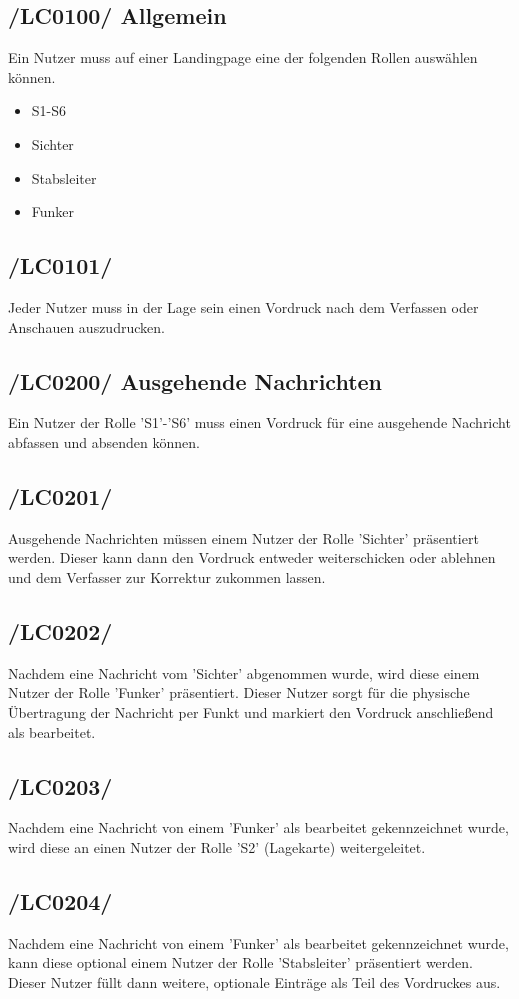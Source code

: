 \subsection{/LC0100/ Allgemein}
Ein Nutzer muss auf einer Landingpage eine der folgenden Rollen auswählen können.
\begin{itemize}
\item S1-S6
\item Sichter
\item Stabsleiter
\item Funker
\end{itemize}

\subsection{/LC0101/}
Jeder Nutzer muss in der Lage sein einen Vordruck nach dem Verfassen oder Anschauen auszudrucken.

\subsection{/LC0200/ Ausgehende Nachrichten} 
Ein Nutzer der Rolle 'S1'-'S6' muss einen Vordruck für eine ausgehende Nachricht abfassen und absenden können.

\subsection{/LC0201/}
Ausgehende Nachrichten müssen einem Nutzer der Rolle 'Sichter' präsentiert werden. Dieser kann dann den Vordruck entweder weiterschicken oder ablehnen und dem Verfasser zur Korrektur zukommen lassen.

\subsection{/LC0202/}
Nachdem eine Nachricht vom 'Sichter' abgenommen wurde, wird diese einem Nutzer der Rolle 'Funker' präsentiert. Dieser Nutzer sorgt für die physische Übertragung der Nachricht per Funkt und markiert den Vordruck anschließend als bearbeitet.

\subsection{/LC0203/}
Nachdem eine Nachricht von einem 'Funker' als bearbeitet gekennzeichnet wurde, wird diese an einen Nutzer der Rolle 'S2' (Lagekarte) weitergeleitet.

\subsection{/LC0204/}
Nachdem eine Nachricht von einem 'Funker' als bearbeitet gekennzeichnet wurde, kann diese optional einem Nutzer der Rolle 'Stabsleiter' präsentiert werden. Dieser Nutzer füllt dann weitere, optionale Einträge als Teil des Vordruckes aus.

